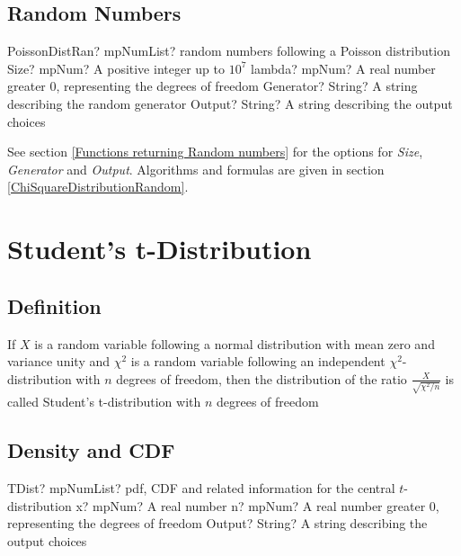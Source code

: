 \subsection{Random Numbers}

\begin{mpFunctionsExtract}
	\mpFunctionFourNotImplemented
	{PoissonDistRan? mpNumList? random numbers following a Poisson distribution}
	{Size? mpNum? A positive integer up to $10^7$}
	{lambda? mpNum? A real number greater 0, representing the degrees of freedom}
	{Generator? String? A string describing the random generator}
	{Output? String? A string describing the output choices}
\end{mpFunctionsExtract}


\vspace{0.3cm}
See section \ref{Functions returning Random numbers} for the options for  {\itshape\sffamily Size},  {\itshape\sffamily Generator} and {\itshape\sffamily Output}. Algorithms and formulas are given in section \ref{ChiSquareDistributionRandom}.




\newpage
\section{Student's t-Distribution}
\subsection{Definition}
\label{tDistributionDefinition}

If $X$ is a random variable following a normal distribution with mean zero and variance unity and $\chi^2$ is a random variable following an independent $\chi^2$-distribution with $n$ degrees of freedom, 
then the distribution of the ratio $\frac{X}{\sqrt{\chi^2 / n}}$ is called Student's t-distribution with $n$ degrees of freedom


\subsection{Density and CDF}

\begin{mpFunctionsExtract}
	\mpFunctionThreeNotImplemented
	{TDist? mpNumList? pdf, CDF and related information for the central $t$-distribution}
	{x? mpNum? A real number}
	{n? mpNum? A real number greater 0, representing the degrees of freedom}
	{Output? String? A string describing the output choices}
\end{mpFunctionsExtract}



